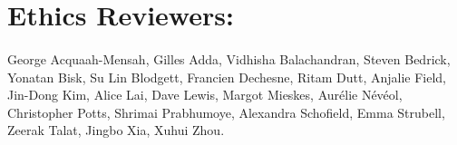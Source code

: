 \section*{Ethics Reviewers:}

\paragraph{}George Acquaah-Mensah, Gilles Adda, Vidhisha Balachandran, Steven Bedrick, Yonatan Bisk, Su Lin Blodgett, Francien Dechesne, Ritam Dutt, Anjalie Field, Jin-Dong Kim, Alice Lai, Dave Lewis, Margot Mieskes, Aurélie Névéol, Christopher Potts, Shrimai Prabhumoye, Alexandra Schofield, Emma Strubell, Zeerak Talat, Jingbo Xia, Xuhui Zhou.
